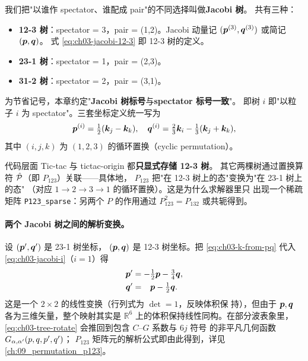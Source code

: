 我们把"以谁作 spectator、谁配成 pair"的不同选择叫做\textbf{Jacobi 树}。
共有三种：
\begin{itemize}
  \item \textbf{12-3 树}：spectator = 3，pair = (1,2)。Jacobi 动量记
        \((\bm{p}^{(3)}, \bm{q}^{(3)})\) 或简记 \((\bm{p}, \bm{q})\)。
        式 \cref{eq:ch03-jacobi-12-3} 即 12-3 树的定义。
  \item \textbf{23-1 树}：spectator = 1，pair = (2,3)。
  \item \textbf{31-2 树}：spectator = 2，pair = (3,1)。
\end{itemize}
为节省记号，本章约定"\textbf{Jacobi 树标号}与\textbf{spectator 标号一致}"。
即树 \(i\) 即"以粒子 \(i\) 为 spectator"。三套坐标定义统一写为
\begin{equation}
\label{eq:ch03-jacobi-i}
\bm{p}^{(i)} = \tfrac{1}{2}(\bm{k}_j - \bm{k}_k),
\quad
\bm{q}^{(i)} = \tfrac{2}{3}\bm{k}_i - \tfrac{1}{3}(\bm{k}_j + \bm{k}_k),
\end{equation}
其中 \((i, j, k)\) 为 \((1,2,3)\) 的循环置换（cyclic permutation）。

\begin{remark}
代码层面 Tic-tac 与 tictac-origin 都\textbf{只显式存储 12-3 树}。
其它两棵树通过置换算符 \(\hat{\mathcal{P}}\)（即 \(P_{123}\)）关联——具体地，
\(P_{123}\) 把"在 12-3 树上的态"变换为"在 23-1 树上的态"
（对应 \(1 \to 2 \to 3 \to 1\) 的循环置换）。这是为什么求解器里只
出现一个稀疏矩阵 \texttt{P123\_sparse}：另两个 \(P\) 的作用通过
\(P_{123}^2 = P_{132}\) 或共轭得到。
\end{remark}

\paragraph{两个 Jacobi 树之间的解析变换。}
设 \((\bm{p}', \bm{q}')\) 是 23-1 树坐标，
\((\bm{p}, \bm{q})\) 是 12-3 树坐标。把
\cref{eq:ch03-k-from-pq} 代入 \cref{eq:ch03-jacobi-i}（\(i=1\)）得
\begin{align}
\label{eq:ch03-tree-rotate}
\bm{p}' &= -\tfrac{1}{2}\bm{p} - \tfrac{3}{4}\bm{q},
\nonumber\\
\bm{q}' &=  \phantom{-}\bm{p} - \tfrac{1}{2}\bm{q}.
\end{align}
这是一个 \(2\times 2\) 的线性变换（行列式为 \(\det = 1\)，反映体积保
持），但由于 \(\bm{p}, \bm{q}\) 各为三维矢量，整个映射其实是
\(\mathbb{R}^6\) 上的体积保持线性同构。在部分波表象里，
\cref{eq:ch03-tree-rotate} 会推回到包含 \(C\)–\(G\) 系数与 \(6j\) 符号
的非平凡几何函数 \(G_{\alpha, \alpha'}(p, q, p', q')\)；
\(P_{123}\) 矩阵元的解析公式即由此得到，详见 \cref{ch:09_permutation_p123}。

